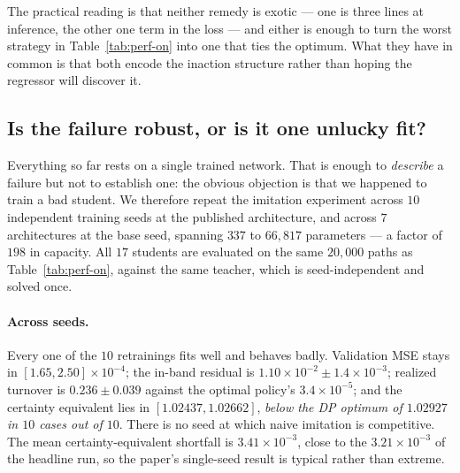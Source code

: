 \documentclass[11pt]{article}
\begin{document}
\noindent
The practical reading is that neither remedy is exotic --- one is three lines at
inference, the other one term in the loss --- and either is enough to turn the
worst strategy in Table~\ref{tab:perf-on} into one that ties the optimum. What
they have in common is that both encode the inaction structure rather than
hoping the regressor will discover it.

\subsection{Is the failure robust, or is it one unlucky fit?}
\label{sec:robustness}
Everything so far rests on a single trained network. That is enough to
\emph{describe} a failure but not to establish one: the obvious objection is
that we happened to train a bad student. We therefore repeat the imitation
experiment across $10$ independent training seeds at the published architecture,
and across $7$ architectures at the base seed, spanning $337$ to $66{,}817$
parameters --- a factor of $198$ in capacity. All $17$ students are evaluated on
the same $20{,}000$ paths as Table~\ref{tab:perf-on}, against the same teacher,
which is seed-independent and solved once.

\paragraph{Across seeds.}
Every one of the $10$ retrainings fits well and behaves badly. Validation MSE
stays in $[1.65,2.50]\times10^{-4}$; the in-band residual is
$1.10\times10^{-2}\pm1.4\times10^{-3}$; realized turnover is
$0.236\pm0.039$ against the optimal policy's $3.4\times10^{-5}$; and the
certainty equivalent lies in $[1.02437,1.02662]$, \emph{below the DP optimum of
$1.02927$ in $10$ cases out of $10$}. There is no seed at which naive imitation
is competitive. The mean certainty-equivalent shortfall is
$3.41\times10^{-3}$, close to the $3.21\times10^{-3}$ of the headline run, so
the paper's single-seed result is typical rather than extreme.
\end{document}
